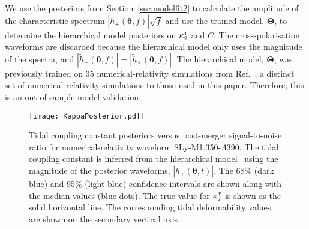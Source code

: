 \documentclass[../Thesis.tex]{subfiles}
\begin{document}
    We use the posteriors from Section~\ref{sec:modelfit2} to calculate the amplitude of the characteristic spectrum $|\tilde{h}_{+}(\boldsymbol{\theta},f)|\sqrt{f}$ and use the trained model, $\boldsymbol{\Theta}$,  to determine the hierarchical model posteriors on $\kappa_2^\textsc{t}$ and $C$.
    The cross-polarisation waveforms are discarded because the hierarchical model only uses the magnitude of the spectra, and  $|\tilde{h}_{+}(\boldsymbol{\theta},f)|=|\tilde{h}_{\times}(\boldsymbol{\theta},f)|$.
    The hierarchical model, $\boldsymbol{\Theta}$, was previously trained on 35 numerical-relativity simulations from Ref.~\cite{Rezzolla2016}, a distinct set of numerical-relativity simulations to those used in this paper.
    Therefore, this is an out-of-sample model validation. \par
\begin{figure}[H]
         \centering
         \texttt{[image: KappaPosterior.pdf]}
         \caption{Tidal coupling constant posteriors versus post-merger signal-to-noise ratio for numerical-relativity waveform SLy-M1.350-$\Lambda$390. The tidal coupling constant is inferred from the hierarchical model~\cite{Easter2019} using the magnitude of the posterior waveforms, $|h_+(\boldsymbol{\theta},t)|$. The 68\% (dark blue) and 95\% (light blue) confidence intervals are shown along with the median values (blue dots). The true value for $\kappa_2^\textsc{t}$ is shown as the solid horizontal line. 
         The corresponding tidal deformability values are shown on the secondary vertical axis.}
         \label{fig:KappavsSNR}
     \end{figure} 
  
\end{document}

